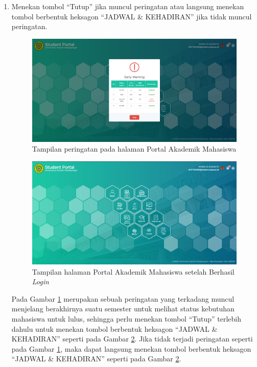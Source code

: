 \documentclass[a4paper,twoside]{article}
\begin{document}
\begin{enumerate}
\begin{enumerate}
			\item Menekan tombol ``Tutup'' jika muncul peringatan atau langsung menekan tombol berbentuk heksagon ``JADWAL \& KEHADIRAN'' jika tidak muncul peringatan.
			\begin{figure}[H]
				\centering
				\includegraphics[scale=0.225]{Gambar/notif.jpg}
				\caption{Tampilan peringatan pada halaman Portal Akademik Mahasiswa} 
				\label{fig:notif}
			\end{figure}
			
			\begin{figure}[H]
				\centering
				\includegraphics[scale=0.225]{Gambar/jadwal.jpg}
				\caption{Tampilan halaman Portal Akademik Mahasiswa setelah Berhasil \textit{Login}} 
				\label{fig:jadwal}
			\end{figure}
			Pada Gambar \ref{fig:notif} merupakan sebuah peringatan yang terkadang muncul menjelang berakhirnya suatu semester untuk melihat status kebutuhan mahasiswa untuk lulus, sehingga perlu menekan tombol ``Tutup'' terlebih dahulu untuk menekan tombol berbentuk heksagon ``JADWAL \& KEHADIRAN'' seperti pada Gambar \ref{fig:jadwal}. Jika tidak terjadi peringatan seperti pada  Gambar \ref{fig:notif}, maka dapat langsung menekan tombol berbentuk heksagon ``JADWAL \& KEHADIRAN'' seperti pada Gambar \ref{fig:jadwal}.
			

\end{enumerate}
\end{enumerate}
\end{document}
